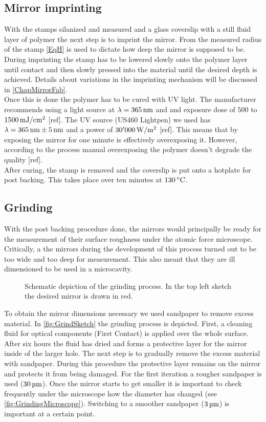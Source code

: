 \subsection{Mirror imprinting}
With the stamps silanized and measured and a glass coverslip with a still fluid layer of polymer the next step is to imprint the mirror. From the measured radius of the stamp \autoref{EqH} is used to dictate how deep the mirror is supposed to be. During imprinting the stamp has to be lowered slowly onto the polymer layer until contact and then slowly pressed into the material until the desired depth is achieved. Details about variations in the imprinting mechanism will be discussed in \autoref{ChapMirrorFab}.\\
Once this is done the polymer has to be cured with UV light. The manufacturer recommends using a light source at $\lambda=365\nm$ and and exposure dose of $500$ to $1500 \mJcm$ [ref]. The UV source (US460 Lightpen) we used has $\lambda = 365\nm \pm 5\nm$ and a power of $30'000\Wm$ [ref]. This means that by exposing the mirror for one minute is effectively overexposing it. However, according to the process manual overexposing the polymer doesn't degrade the quality [ref].\\
After curing, the stamp is removed and the coverslip is put onto a hotplate for post backing. This takes place over ten minutes at $130\degrees$.

\subsection{Grinding}\label{ChapGrinding}
With the post backing procedure done, the mirrors would principally be ready for the measurement of their surface roughness under the atomic force microscope. Critically, a the mirrors during the development of this process turned out to be too wide and too deep for measurement. This also meant that they are ill dimensioned to be used in a microcavity.

\begin{figure}[H]
	
	\caption{Schematic depiction of the grinding process. In the top left sketch the desired mirror is drawn in red.}
	\label{fig:GrindSketch}
\end{figure}

To obtain the mirror dimensions necessary we used sandpaper to remove excess material. In \autoref{fig:GrindSketch} the grinding process is depicted. First, a cleaning fluid for optical components (First Contact) is applied over the whole surface. After six hours the fluid has dried and forms a protective layer for the mirror inside of the larger hole. The next step is to gradually remove the excess material with sandpaper. During this procedure the protective layer remains on the mirror and protects it from being damaged. For the first iteration a rougher sandpaper is used ($30\um$). Once the mirror starts to get smaller it is important to check frequently under the microscope how the diameter has changed (see \autoref{fig:GrindingMicroscope}). Switching to a smoother sandpaper ($3\um$) is important at a certain point.

